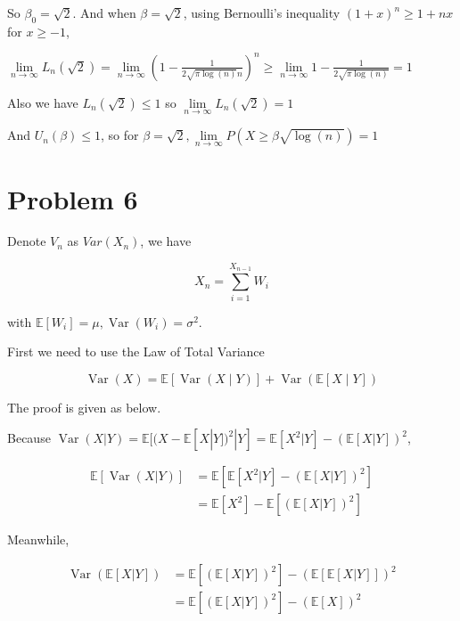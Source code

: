 \documentclass{article}
\begin{document}
So $\beta_0 = \sqrt{2}$. And when $\beta = \sqrt{2}$, using Bernoulli's inequality $(1+x)^n \geqslant 1+nx$ for $x\geqslant -1$,

$\lim\limits_{n\to\infty} L_n(\sqrt{2}) = \lim\limits_{n\to\infty} \left(1-\frac{1}{2\sqrt{\pi \log(n)} n}\right)^n \geqslant \lim\limits_{n\to\infty} 1-\frac{1}{2\sqrt{\pi \log(n)}} = 1$

Also we have $L_n(\sqrt{2}) \leqslant 1$ so  $\lim\limits_{n\to\infty} L_n(\sqrt{2}) = 1$

And $U_n(\beta) \leqslant 1$, so for $\beta= \sqrt{2},\lim\limits_{n\to\infty} P(X\geq \beta \sqrt{\log(n)}) = 1$

\section{Problem 6}

Denote $V_n$ as $Var(X_n)$, we have 

\begin{equation}
    X_n = \sum_{i=1}^{X_{n-1}} W_i
\end{equation}

with $\mathbb{E}[W_i] = \mu,\operatorname{Var}(W_i) = \sigma^2$.

First we need to use the Law of Total Variance 

\begin{equation}
    \operatorname{Var}(X)=\mathbb{E}[\operatorname{Var}(X \mid Y)]+\operatorname{Var}(\mathbb{E}[X \mid Y])
\end{equation}

The proof is given as below.

Because $\operatorname{Var} (X|Y) = \mathbb{E}[(X-\mathbb{E}[X|Y])^2 |Y] = \mathbb{E}[X^2|Y] - (\mathbb{E}[X|Y])^2$,

\begin{equation}
  \begin{aligned}
    \mathbb{E}[\operatorname{Var} (X|Y)]& = \mathbb{E}[ \mathbb{E}[X^2|Y] - (\mathbb{E}[X|Y])^2] \\& = \mathbb{E}[X^2] - \mathbb{E}[(\mathbb{E}[X|Y])^2]
  \end{aligned}
\end{equation}

Meanwhile,

\begin{equation}
  \begin{aligned}
    \operatorname{Var}(\mathbb{E}[X|Y]) & = \mathbb{E} [ (\mathbb{E}[X|Y])^2 ]- (\mathbb{E}[\mathbb{E}[X|Y]])^2 \\
    & = \mathbb{E} [ (\mathbb{E}[X|Y])^2 ]- (\mathbb{E}[X])^2 
  \end{aligned}
\end{equation}
\end{document}
